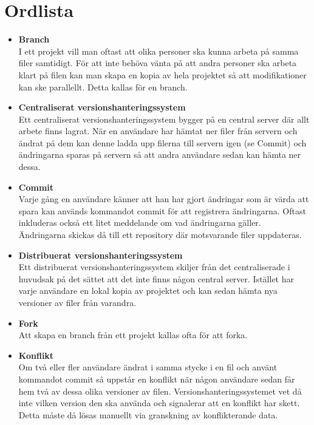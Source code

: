 \section{Ordlista}
\begin{itemize}
	\item \textbf{Branch}
	\\I ett projekt vill man oftast att olika personer ska kunna arbeta på samma filer samtidigt. För att inte behöva vänta på att andra personer ska arbeta klart på filen kan man skapa en kopia av hela projektet så att modifikationer kan ske parallellt. Detta kallas för en branch.
	
	\item \textbf{Centraliserat versionshanteringssystem}
	\\Ett centraliserat versionshanteringssystem bygger på en central server där allt arbete finns lagrat. När en användare har hämtat ner filer från servern och ändrat på dem kan denne ladda upp filerna till servern igen (se Commit) och ändringarna sparas på servern så att andra användare sedan kan hämta ner dessa.
	
	\item \textbf{Commit}
	\\Varje gång en användare känner att han har gjort ändringar som är värda att spara kan används kommandot commit för att registrera ändringarna. Oftast inkluderas också ett litet meddelande om vad ändringarna gäller. Ändringarna skickas då till ett repository där motsvarande filer uppdateras.
	
	\item \textbf{Distribuerat versionshanteringssystem}
	\\Ett distribuerat versionshanteringssystem skiljer från det centraliserade i huvudsak på det sättet att det inte finns någon central server. Istället har varje användare en lokal kopia av projektet och kan sedan hämta nya versioner av filer från varandra.
	
	\item \textbf{Fork}
	\\Att skapa en branch från ett projekt kallas ofta för att forka.
	
	\item \textbf{Konflikt}
	\\Om två eller fler användare ändrat i samma stycke i en fil och använt kommandot commit så uppstår en konflikt när någon användare sedan får hem två av dessa olika versioner av filen. Versionshanteringssystemet vet då inte vilken version den ska använda och signalerar att en konflikt har skett. Detta måste då lösas manuellt via granskning av konflikterande data.


\end{itemize}
